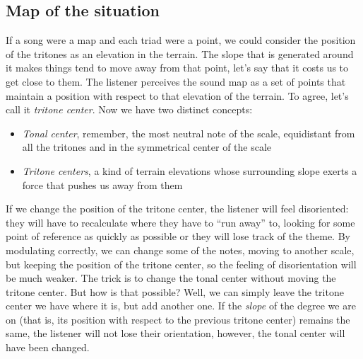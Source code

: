 \documentclass[]{report}
\providecommand{\tightlist}{%
\setlength{\itemsep}{0pt}
\setlength{\parskip}{0pt}
}
\begin{document}
\subsection{Map of the situation}
If a song were a map and each triad were a point, we could consider the position of the tritones as an elevation in the terrain. The slope that is generated around it makes things tend to move away from that point, let's say that it costs us to get close to them.
The listener perceives the sound map as a set of points that maintain a position with respect to that elevation of the terrain. To agree, let's call it \emph{tritone center}.
Now we have two distinct concepts:
\begin{itemize} \tightlist
\item \emph{Tonal center}, remember, the most neutral note of the scale, equidistant from all the tritones and in the symmetrical center of the scale
\item \emph{Tritone centers}, a kind of terrain elevations whose surrounding slope exerts a force that pushes us away from them
\end{itemize}
If we change the position of the tritone center, the listener will feel disoriented: they will have to recalculate where they have to ``run away'' to, looking for some point of reference as quickly as possible or they will lose track of the theme.
By modulating correctly, we can change some of the notes, moving to another scale, but keeping the position of the tritone center, so the feeling of disorientation will be much weaker.
The trick is to change the tonal center without moving the tritone center. But how is that possible? Well, we can simply leave the tritone center we have where it is, but add another one. If the \emph{slope} of the degree we are on (that is, its position with respect to the previous tritone center) remains the same, the listener will not lose their orientation, however, the tonal center will have been changed.
\end{document}
